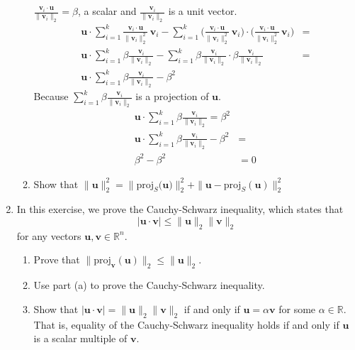 \documentclass{article}
\begin{document}
\begin{enumerate}
\begin{enumerate}
	$\frac{\mathbf{v}_i \cdot \mathbf{u}}{\| \mathbf{v}_i \|_2} = \beta$, a scalar and $\frac{\mathbf{v}_i}{\| \mathbf{v}_i \|_2}$ is a unit vector.\\
	\begin{align*}
		\mathbf{u} \cdot \sum_{i=1}^k \frac{\mathbf{v}_i \cdot \mathbf{u}}{\| \mathbf{v}_i \|_2^2} \, \mathbf{v}_i - \sum_{i=1}^k \bigg(\frac{\mathbf{v}_i \cdot \mathbf{u}}{\| \mathbf{v}_i \|_2^2} \, \mathbf{v}_i\bigg) \cdot \bigg(\frac{\mathbf{v}_i \cdot \mathbf{u}}{\| \mathbf{v}_i \|_2^2} \, \mathbf{v}_i\bigg) &= \\
		\mathbf{u} \cdot \sum_{i=1}^k \beta \frac{\mathbf{v}_i}{\| \mathbf{v}_i \|_2} - \sum_{i=1}^k \beta \frac{\mathbf{v}_i}{\| \mathbf{v}_i \|_2} \cdot \beta \frac{\mathbf{v}_i}{\| \mathbf{v}_i \|_2} &= \\
		\mathbf{u} \cdot \sum_{i=1}^k \beta \frac{\mathbf{v}_i}{\| \mathbf{v}_i \|_2} - \beta^2
	\end{align*}
	Because $\sum_{i=1}^k \beta \frac{\mathbf{v}_i}{\| \mathbf{v}_i \|_2}$ is a projection of $\mathbf{u}$. 
	\begin{align*}
		\mathbf{u} \cdot \sum_{i=1}^k \beta \frac{\mathbf{v}_i}{\| \mathbf{v}_i \|_2} = \beta^2 \\
		\mathbf{u} \cdot \sum_{i=1}^k \beta \frac{\mathbf{v}_i}{\| \mathbf{v}_i \|_2} - \beta^2 &= \\
		\beta^2 - \beta^2 &= 0
	\end{align*}
	\item Show that $\| \mathbf{u} \|_2^2 = \| \text{proj}_S(\mathbf{u)} \|_2^2 + \| \mathbf{u} - \text{proj}_S(\mathbf{u}) \|_2^2$
	\end{enumerate}
	
\item In this exercise, we prove the Cauchy-Schwarz inequality, which states that
\[ | \mathbf{u} \cdot \mathbf{v} | \leq \| \mathbf{u} \|_2 \| \mathbf{v} \|_2 \]
for any vectors $\mathbf{u, v} \in \mathbb{R}^n$.
	\begin{enumerate}
	\item Prove that $\| \text{proj}_{\mathbf{v}}(\mathbf{u}) \|_2 \leq \| \mathbf{u} \|_2$.
	\item Use part (a) to prove the Cauchy-Schwarz inequality.
	\item Show that $| \mathbf{u} \cdot \mathbf{v} | = \| \mathbf{u} \|_2 \| \mathbf{v} \|_2$ if and only if $\mathbf{u} = \alpha \mathbf{v}$ for some $\alpha \in \mathbb{R}$. That is, equality of the Cauchy-Schwarz inequality holds if and only if $\mathbf{u}$ is a scalar multiple of $\mathbf{v}$. 
	\end{enumerate}
\end{enumerate}
	
\end{document}
